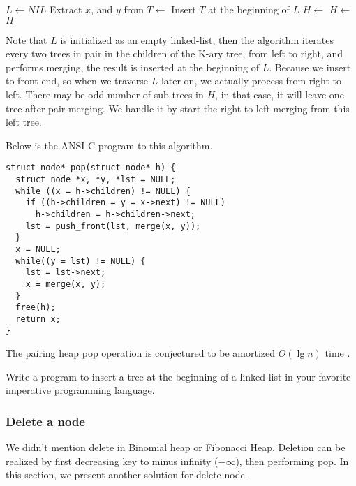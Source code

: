 \documentclass{article}
\begin{document}
\begin{algorithmic}[1]
  \State $L \gets NIL$
    \State Extract $x$, and $y$ from 
    \State $T \gets $ 
    \State Insert $T$ at the beginning of $L$
  \EndFor
  \State $H \gets $  
    \State $H \gets $ 
  \EndFor
  \State \Return $H$
\EndFunction
\end{algorithmic}

Note that $L$ is initialized as an empty linked-list, then the algorithm
iterates every two trees in pair in the children of the K-ary tree, from
left to right, and performs merging, the result is inserted at the beginning
of $L$. Because we insert to front end, so when we traverse $L$ later on,
we actually process from right to left. There may be odd number of sub-trees
in $H$, in that case, it will leave one tree after pair-merging. We
handle it by start the right to left merging from this left tree.

Below is the ANSI C program to this algorithm.

\lstset{language=C}
\begin{lstlisting}
struct node* pop(struct node* h) {
  struct node *x, *y, *lst = NULL;
  while ((x = h->children) != NULL) {
    if ((h->children = y = x->next) != NULL)
      h->children = h->children->next;
    lst = push_front(lst, merge(x, y));
  }
  x = NULL;
  while((y = lst) != NULL) {
    lst = lst->next;
    x = merge(x, y);
  }
  free(h);
  return x;
}
\end{lstlisting}

The pairing heap pop operation is conjectured to be amortized $O(\lg n)$
time \cite{pairing-heap}.

\begin{Exercise}
Write a program to insert a tree at the beginning of a linked-list
in your favorite imperative programming language.
\end{Exercise}

\subsubsection{Delete a node}
We didn't mention delete in Binomial heap or Fibonacci Heap. Deletion
can be realized by first decreasing key to minus infinity ($-\infty$), then
performing pop. In this section, we present another solution for
delete node.
\end{document}
